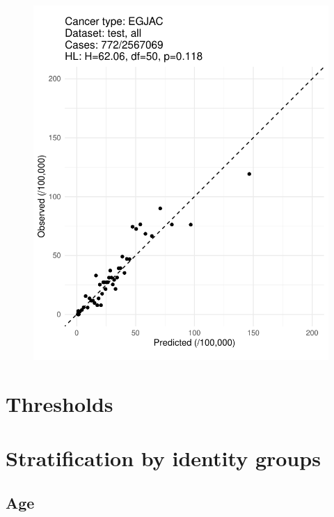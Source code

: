 \documentclass[english]{article}
\begin{document}
\begin{figure}[ht]
\includegraphics[width=0.9\linewidth]{calibration/EGJAC_all.pdf}
\end{figure}



\newpage
\clearpage
\section{Thresholds}





\newpage
\clearpage
\section{Stratification by identity groups}

\subsection{Age}
\end{document}
